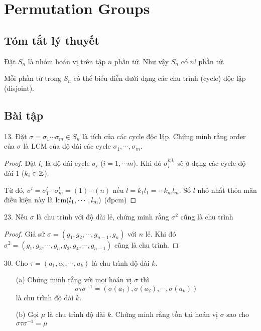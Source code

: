 \section*{Permutation Groups}

\subsection*{Tóm tắt lý thuyết}

Đặt $S_n$ là nhóm hoán vị trên tập $n$ phần tử. Như vậy $S_n$ có $n!$ phần tử.

Mỗi phần tử trong $S_n$ có thể biểu diễn dưới dạng các chu trình (cycle) độc lập (disjoint).

\subsection*{Bài tập}

13. Đặt $\sigma = \sigma_1 \cdots \sigma_m \in S_n$ là tích của các cycle độc lập. Chứng minh rằng order của $\sigma$ là LCM của độ dài các cycle $\sigma_1, \cdots, \sigma_m$.

\begin{proof}
    Đặt $l_i$ là độ dài cycle $\sigma_i$ ($i = 1, \cdots m$). Khi đó $\sigma_i^{k_i l_i}$ sẽ ở dạng các cycle độ dài 1 ($k_i \in \mathbb{Z}$).

    Từ đó, $\sigma^l = \sigma_1^l \cdots \sigma_m^l = (1)\cdots(n)$ nếu $l = k_1 l_1 = \cdots k_m l_m$. Số $l$ nhỏ nhất thỏa mãn điều kiện này là $\text{lcm}(l_1, \cdots, l_m)$ (đpcm)

\end{proof}

23. Nếu $\sigma$ là chu trình với độ dài lẻ, chứng minh rằng $\sigma^2$ cũng là chu trình
\begin{proof}
    Giả sử $\sigma = (g_1, g_2, \cdots, g_{n-1}, g_n)$ với $n$ lẻ. Khi đó $\sigma^2 = (g_1, g_3, \cdots, g_n, g_2, g_4, \cdots, g_{n-1})$ cũng là chu trình.
\end{proof}

30. Cho $\tau = (a_1, a_2, \cdots, a_k)$ là chu trình độ dài $k$.

\begin{enumerate}
    \item[(a)] Chứng minh rằng với mọi hoán vị $\sigma$ thì $$\sigma \tau \sigma^{-1} = (\sigma(a_1), \sigma(a_2), \cdots, \sigma(a_k))$$ là chu trình độ dài $k$.
    \item[(b)] Gọi $\mu$ là chu trình độ dài $k$. Chứng minh rằng tồn tại hoán vị $\sigma$ sao cho $\sigma \tau \sigma^{-1} = \mu$
\end{enumerate}

